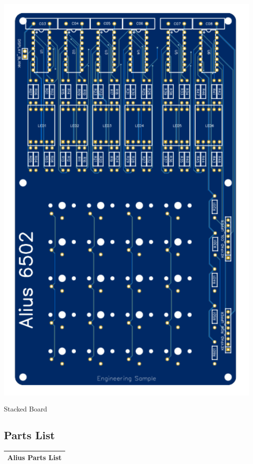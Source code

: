 \documentclass{ol-softwaremanual}
\begin{document}
\begin{ffcode}
\begin{center}
\includegraphics[angle=-90,width=13.5cm]{Top_Board.PNG}

Stacked Board
\end{center}

\pagebreak

\subsection{Parts List}

\begin{table}[H]
\begin{adjustbox}{width=0.9\textwidth,center=1\textwidth}
\begin{tabular}{|lll|}
\hline
\multicolumn{3}{|c|}{\textbf{Alius Parts List}}\\ \hline


\end{tabular}
\end{adjustbox}
\end{table}
\end{ffcode}
\end{document}
